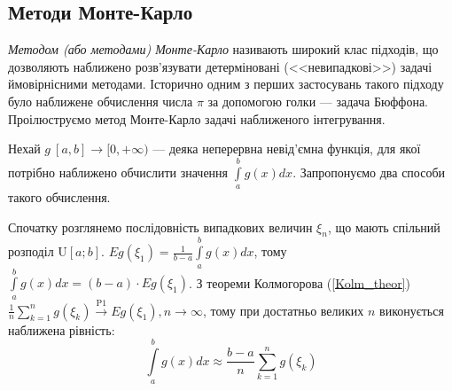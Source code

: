 \subsection{Методи Монте-Карло}
\emph{Методом (або методами) Монте-Карло} називають широкий клас підходів, що дозволяють наближено розв'язувати детерміновані (<<невипадкові>>) задачі ймовірнісними методами. 
Історично одним з перших застосувань такого підходу було наближене обчислення числа $\pi$ за допомогою голки --- задача Бюффона. Проілюструємо метод Монте-Карло задачі наближеного інтегрування.

Нехай $g\:[a,b]\to[0,+\infty)$ --- деяка неперервна невід'ємна функція, для якої потрібно наближено обчислити значення $\int\limits_a^b g(x) dx$. Запропонуємо два способи такого обчислення.

Спочатку розглянемо послідовність випадкових величин $\xi_n$, що мають спільний розподіл $\mathrm{U}[a; b]$.
$Eg(\xi_1) = \frac{1}{b-a} \int\limits_a^b g(x) dx$, тому $\int\limits_a^b g(x) dx = (b-a)\cdot E g(\xi_1)$. З теореми Колмогорова (\ref{Kolm_theor})
$\frac{1}{n}\sum\limits_{k=1}^n g(\xi_k) \overset{\mathrm{P1}}{\longrightarrow} Eg(\xi_1), n\to\infty$, тому при достатньо великих $n$ виконується наближена рівність:
$$\int\limits_a^b g(x) dx\approx\frac{b-a}{n}\sum\limits_{k=1}^ng(\xi_k)$$

